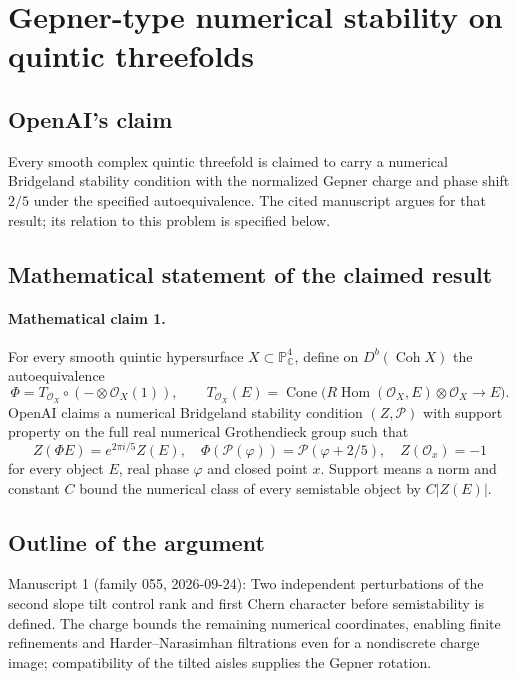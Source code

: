 \documentclass[11pt]{article}
\begin{document}
\section*{Gepner-type numerical stability on quintic threefolds}

\subsection{OpenAI's claim}
Every smooth complex quintic threefold is claimed to carry a numerical Bridgeland stability condition with the normalized Gepner charge and phase shift $2/5$ under the specified autoequivalence. The cited manuscript argues for that result; its relation to this problem is specified below.

\subsection{Mathematical statement of the claimed result}
\paragraph{Mathematical claim 1.} For every smooth quintic hypersurface $X\subset\mathbb P^4_{\mathbb C}$, define on $D^b(\operatorname{Coh}X)$ the autoequivalence
\[
\Phi=T_{\mathcal O_X}\circ(-\otimes\mathcal O_X(1)),\qquad
T_{\mathcal O_X}(E)=\operatorname{Cone}\bigl(R\operatorname{Hom}(\mathcal O_X,E)\otimes\mathcal O_X\to E\bigr).
\]
OpenAI claims a numerical Bridgeland stability condition $(Z,\mathcal P)$ with support property on the full real numerical Grothendieck group such that
\[
Z(\Phi E)=e^{2\pi i/5}Z(E),\quad
\Phi(\mathcal P(\varphi))=\mathcal P(\varphi+2/5),\quad
Z(\mathcal O_x)=-1
\]
for every object $E$, real phase $\varphi$ and closed point $x$. Support means a norm and constant $C$ bound the numerical class of every semistable object by $C|Z(E)|$.

\subsection{Outline of the argument}
Manuscript 1 (family 055, 2026-09-24): Two independent perturbations of the second slope tilt control rank and first Chern character before semistability is defined. The charge bounds the remaining numerical coordinates, enabling finite refinements and Harder--Narasimhan filtrations even for a nondiscrete charge image; compatibility of the tilted aisles supplies the Gepner rotation.
\end{document}
